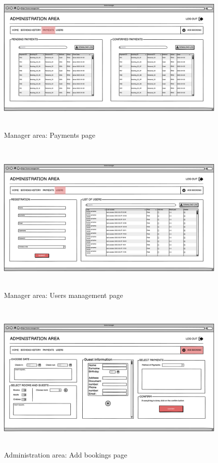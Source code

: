 \begin{figure}[H]
	\centering
	\includegraphics[height=7.5cm]{images/manager-payments.png} 
	\caption{Manager area: Payments page}
\end{figure}
\begin{figure}[H]
	\centering
	\includegraphics[height=7.5cm]{images/manager-users-page.png} 
	\caption{Manager area: Users management page}
\end{figure}
\begin{figure}[H]
	\centering
	\includegraphics[height=7.5cm]{images/admin-add-books.png} 
	\caption{Administration area: Add bookings page}
\end{figure}